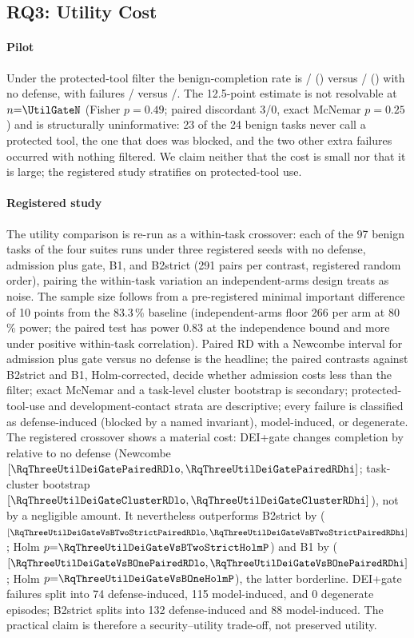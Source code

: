 \subsection{RQ3: Utility Cost}
\label{sec:rq3}
\paragraph*{Pilot}
Under the protected-tool filter the benign-completion rate is
\UtilGatePass/\UtilGateN{} (\UtilGateRate) versus \UtilNdPass/\UtilNdN{}
(\UtilNdRate) with no defense, with failures \UtilGateBlock/\UtilGateN{}
versus \UtilNdBlock/\UtilNdN. The 12.5-point estimate is not resolvable
at $n{=}\UtilGateN$ (Fisher $p{=}0.49$; paired discordant 3/0, exact
McNemar $p{=}0.25$) and is structurally uninformative: 23 of the 24
benign tasks never call a protected tool, the one that does was
blocked, and the two other extra failures occurred with nothing
filtered. We claim neither that the cost is small nor that it is
large; the registered study stratifies on protected-tool use.

\paragraph*{Registered study}
The utility comparison is re-run as a within-task crossover: each of
the 97 benign tasks of the four suites runs under three registered
seeds with no defense, admission plus gate, B1, and B2strict (291 pairs
per contrast, registered random order), pairing the within-task
variation an independent-arms design treats as noise. The sample size
follows from a pre-registered minimal important difference of 10 points
from the 83.3\,\% baseline (independent-arms floor 266 per arm at
80\,\% power; the paired test has power 0.83 at the independence bound
and more under positive within-task correlation). Paired RD with a
Newcombe interval for admission plus gate versus no defense is the
headline; the paired contrasts against B2strict and B1, Holm-corrected,
decide whether admission costs less than the filter; exact McNemar and
a task-level cluster bootstrap is secondary; protected-tool-use and
development-contact strata are descriptive; every failure is classified
as defense-induced (blocked by a named invariant), model-induced, or
degenerate.
The registered crossover shows a material cost: DEI+gate changes
completion by \RqThreeUtilDeiGatePairedRD{} relative to no defense
(Newcombe $[\RqThreeUtilDeiGatePairedRDlo,\RqThreeUtilDeiGatePairedRDhi]$;
task-cluster bootstrap $[\RqThreeUtilDeiGateClusterRDlo,\RqThreeUtilDeiGateClusterRDhi]$),
not by a negligible amount. It nevertheless outperforms B2strict by
\RqThreeUtilDeiGateVsBTwoStrictPairedRD{}
($[\RqThreeUtilDeiGateVsBTwoStrictPairedRDlo,\RqThreeUtilDeiGateVsBTwoStrictPairedRDhi]$;
Holm $p{=}\RqThreeUtilDeiGateVsBTwoStrictHolmP$) and B1 by
\RqThreeUtilDeiGateVsBOnePairedRD{}
($[\RqThreeUtilDeiGateVsBOnePairedRDlo,\RqThreeUtilDeiGateVsBOnePairedRDhi]$;
Holm $p{=}\RqThreeUtilDeiGateVsBOneHolmP$), the latter borderline.
DEI+gate failures split into 74 defense-induced, 115 model-induced, and
0 degenerate episodes; B2strict splits into 132 defense-induced and 88
model-induced. The practical claim is therefore a security--utility
trade-off, not preserved utility.

